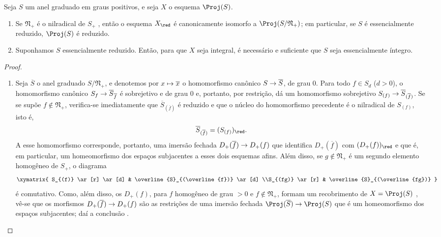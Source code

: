 \documentclass[oneside,10pt]{amsart}
\makeatletter
\newcommand{\ega@arrow}[2]{\mathchoice{#1}{#2}{#2}{#2}}
\let\ega@shortmapsto\mapsto
\renewcommand{\to}{\ega@arrow{\longrightarrow}{\rightarrow}}
\renewcommand{\mapsto}{\ega@arrow{\longmapsto}{\ega@shortmapsto}}
\let\EGAOriginalLabel\label
\renewcommand{\label}[1]{\phantomsection\EGAOriginalLabel{#1}}
\makeatother
\begin{document}
\begin{proposition}[2.4.4]
\label{II.2.4.4}
Seja $S$ um anel graduado em graus positivos, e seja $X$ o esquema $\Proj(S)$.
\begin{enumerate}
  \item[\rm(i)] Se $\mathfrak{N}_+$ é o nilradical de $S_+$ , então o esquema $X_\red$ é canonicamente isomorfo a $\Proj(S/\mathfrak{N}_+)$; em particular, se $S$ é essencialmente reduzido, $\Proj(S)$ é reduzido.
  \item[\rm(ii)] Suponhamos $S$ essencialmente reduzido. Então, para que $X$ seja integral, é necessário e suficiente que $S$ seja essencialmente íntegro.
\end{enumerate}
\end{proposition}

\begin{proof}
\medskip\noindent
\begin{enumerate}
  \item[\rm(i)] Seja $\overline{S}$ o anel graduado $S/\mathfrak{N}_+$, e denotemos por $x\mapsto\overline{x}$ o homomorfismo canônico $S\to\overline{S}$, de grau $0$.
  Para todo $f\in S_d$ ($d>0$), o homomorfismo canônico $S_f\to\overline{S}_{\overline{f}}$  é sobrejetivo e de grau $0$ e, portanto, por restrição, dá um homomorfismo sobrejetivo $S_{(f)}\to\overline{S}_{(\overline{f})}$.
  Se se supõe $f\notin\mathfrak{N}_+$, verifica-se imediatamente que $\overline{S}_{(\overline{f})}$ é reduzido e que o núcleo do homomorfismo precedente é o nilradical de $S_{(f)}$, isto é,
  \[
    \overline{S}_{(\overline{f})}=(S_{(f)})_\red.
  \]
  A esse homomorfismo corresponde, portanto, uma imersão fechada $D_+(\overline{f})\to D_+(f)$ que identifica $D_+(\overline{f})$ com $(D_+(f))_\red$  e que é, em particular, um homeomorfismo dos espaços subjacentes a esses dois esquemas afins.
  Além disso, se $g\notin\mathfrak{N}_+$ é um segundo elemento homogêneo de $S_+$, o diagrama
  \[
    \xymatrix{
      S_{(f)} \ar[r] \ar[d]
      & \overline{S}_{(\overline{f})} \ar[d]
    \\S_{(fg)} \ar[r]
      & \overline{S}_{(\overline{fg})}
    }
  \]
  é comutativo.
  Como, além disso, os $D_+(f)$, para $f$ homogêneo de grau $>0$ e $f\notin\mathfrak{N}_+$, formam um recobrimento de $X=\Proj(S)$ , vê-se que os morfismos $D_+(\overline{f})\to D_+(f)$ são as restrições de uma imersão fechada $\Proj(\overline{S})\to\Proj(S)$ que é um homeomorfismo dos espaços subjacentes; daí a conclusão .

\end{enumerate}
\end{proof}
\end{document}

